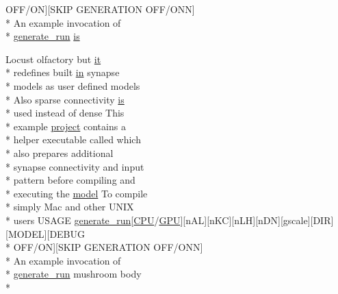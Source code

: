 \begin{DoxyCompactItemize}
O\+F\+F/O\+N\mbox{]}\mbox{[}S\+K\+I\+P G\+E\+N\+E\+R\+A\+T\+I\+O\+N O\+F\+F/O\+N\+N\mbox{]} \\*
An example invocation of \\*
\hyperlink{userproject_2MBody__userdef__project_2README_8txt_a320a215d1e27b4de394be70e90d22863}{generate\+\_\+run} \hyperlink{userproject_2MBody__userdef__project_2README_8txt_a7b4e6cf78d14ce882cb8ff127e01babd}{is}
\item 
Locust olfactory but \hyperlink{userproject_2PoissonIzh__project_2README_8txt_a3e3bbb6c9b14c38757cf273a117e43e8}{it} \\*
redefines built \hyperlink{README_8txt_a148897a6b2cc9cff25af80abb13426b0}{in} synapse \\*
models as user defined models \\*
Also sparse connectivity \hyperlink{userproject_2MBody__userdef__project_2README_8txt_a7b4e6cf78d14ce882cb8ff127e01babd}{is} \\*
used instead of dense This \\*
example \hyperlink{userproject_2SynDelay__project_2README_8txt_a762c750134e07a31b7965860fd292b51}{project} contains a \\*
helper executable called which \\*
also prepares additional \\*
synapse connectivity and input \\*
pattern before compiling and \\*
executing the \hyperlink{README_8txt_a69fd801b7213948c12d9dd7eebb3ed14}{model} To compile \\*
simply Mac and other U\+N\+I\+X \\*
users U\+S\+A\+G\+E \hyperlink{userproject_2MBody__userdef__project_2README_8txt_a320a215d1e27b4de394be70e90d22863}{generate\+\_\+run}\mbox{[}\hyperlink{README_8txt_a74a069e3c75797de2636c4dd14daa147}{C\+P\+U}/\hyperlink{modelSpec_8h_a39cb9803524b6f3b783344b2f89867b4}{G\+P\+U}\mbox{]}\mbox{[}n\+A\+L\mbox{]}\mbox{[}n\+K\+C\mbox{]}\mbox{[}n\+L\+H\mbox{]}\mbox{[}n\+D\+N\mbox{]}\mbox{[}gscale\mbox{]}\mbox{[}D\+I\+R\mbox{]}\mbox{[}M\+O\+D\+E\+L\mbox{]}\mbox{[}D\+E\+B\+U\+G \\*
O\+F\+F/O\+N\mbox{]}\mbox{[}S\+K\+I\+P G\+E\+N\+E\+R\+A\+T\+I\+O\+N O\+F\+F/O\+N\+N\mbox{]} \\*
An example invocation of \\*
\hyperlink{userproject_2MBody__userdef__project_2README_8txt_a320a215d1e27b4de394be70e90d22863}{generate\+\_\+run} mushroom body \\*

\end{DoxyCompactItemize}
